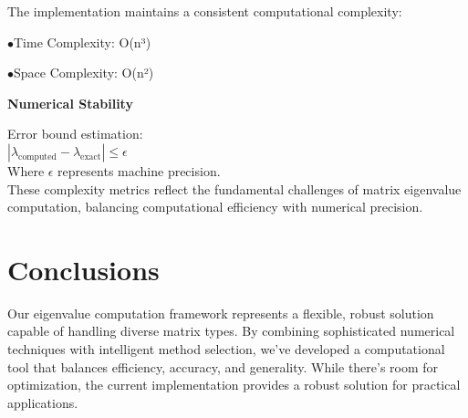\documentclass[a4paper,12pt]{article}
\begin{document}
\noindent The implementation maintains a consistent computational complexity:

$\bullet$Time Complexity: O(n³)

$\bullet$Space Complexity: O(n²)

\noindent\textbf{Numerical Stability}

\noindent Error bound estimation:\\
$|\lambda_{\text{computed}} - \lambda_{\text{exact}}| \leq \epsilon$\\
Where $\epsilon$ represents machine precision.\\

\noindent These complexity metrics reflect the fundamental challenges of matrix eigenvalue computation, balancing computational efficiency with numerical precision.

\section{Conclusions}
Our eigenvalue computation framework represents a flexible, robust solution capable of handling diverse matrix types. By combining sophisticated numerical techniques with intelligent method selection, we've developed a computational tool that balances efficiency, accuracy, and generality. While there's room for optimization, the current implementation provides a robust solution for practical applications.
\end{document}
